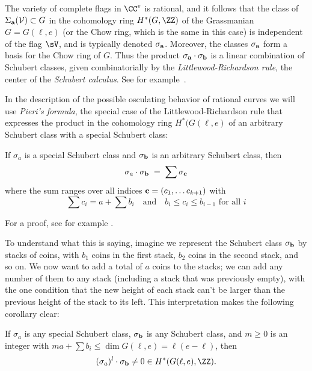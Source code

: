 \begin{fact}
The variety of complete flags in $\CC^e$ is rational, and it follows that the class of $\Sigma_{\bf a}({\cal V})\subset G$
in the cohomology ring $H^*(G, \ZZ)$ of the Grassmanian $G = G(\ell, e)$ (or the Chow ring, which is the same in this case) is independent
of the flag $\sV$, and is typically denoted $\sigma_{\bf a}$. Moreover, the classes $\sigma_{\bf a}$ form a basis for the Chow ring of $G$. Thus the product $\sigma_{\bf a} \cdot \sigma_{\bf b}$ is a linear combination of Schubert classes,
given combinatorially by the \emph{Littlewood-Richardson rule}, the center of the \emph{Schubert calculus}. See for example~\cite{MR2247964}.
\end{fact}

In the description of the possible osculating behavior of rational curves we will use \emph{Pieri's formula}, the special
case of the Littlewood-Richardson rule that expresses the product in the cohomology ring $H^*(G(\ell, e)$ of an arbitrary Schubert class with a special Schubert class: 

\begin{fact}
\begin{proposition}\label{Pieri}
If $\sigma_a$ is a special Schubert class and $\sigma_{\bf b}$ is an arbitrary Schubert class, then
$$
\sigma_a \cdot \sigma_{\bf b} \; = \; \sum \sigma_{\bf c}
$$
where the sum ranges over all indices ${\bf c} = (c_1, \dots c_{k+1})$ with
$$
\sum c_i = a + \sum b_i \quad \text{and} \quad b_i \leq c_i \leq b_{i-1} \text{ for all } i
$$
\end{proposition}

For a proof, see for example \cite[Section 4.2.4]{3264}.
\end{fact}
To understand what this is saying, imagine we represent the Schubert class $\sigma_{\bf b}$ by stacks of coins, with $b_1$ coins in the first stack, $b_2$ coins in the second stack, and so on. We now want to add a total of $a$ coins to the stacks; we can add any number of them to any stack (including a stack that was previously empty), with the one condition that the new height of each stack can't be larger than the previous height of the stack to its left. This interpretation makes the following corollary clear:

\begin{corollary}\label{intersection with sigma nonzero}
If $\sigma_a$ is any special Schubert class, $\sigma_{\bf b}$ is any Schubert class,
and $m\geq 0$ is an integer with $m a + \sum b_i \leq \dim G(\ell, e) = \ell(e-\ell)$, then   
$$
(\sigma_a)^l \cdot \sigma_{\bf b} \neq 0 \in H^*(G(\ell, e), \ZZ).
$$
\end{corollary}

